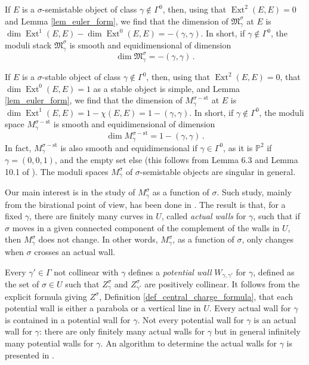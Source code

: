 \documentclass[12pt, a4paper]{amsart}
\newcommand\PP{\mathbb P}
\newcommand\fM{\mathfrak M}
\newcommand\Ext{\operatorname{Ext}}
\newcommand\st{\mathrm{st}}
\begin{document}
If $E$ is a $\sigma$-semistable object of class $\gamma \notin \Gamma^0$, then,
using that $\Ext^2(E,E)=0$ and Lemma \ref{lem_euler_form},
we find that the dimension of 
$\fM_\gamma^{\sigma}$ at $E$ is
$\dim \Ext^1(E,E)-\dim \Ext^0(E,E)
=-(\gamma,\gamma)$. In short, if
$\gamma \notin \Gamma^0$, the moduli stack
$\fM_\gamma^{\sigma}$ is smooth and equidimensional of dimension
\[ \dim \fM_\gamma^\sigma=-(\gamma,\gamma)\,.\]

If $E$ is a $\sigma$-stable object of class $\gamma \notin \Gamma^0$, then,
using that $\Ext^2(E,E)=0$, that $\dim \Ext^0(E,E)=1$
as a stable object is simple, and Lemma \ref{lem_euler_form},
we find that the dimension of $M_\gamma^{\sigma-\st}$ at $E$ is $\dim \Ext^1(E,E)=1-\chi(E,E)=1-(\gamma,\gamma)$.
In short, if $\gamma \notin \Gamma^0$, the moduli space $M_\gamma^{\sigma-\st}$ is smooth and equidimensional of dimension
\[ \dim M_\gamma^{\sigma-\st}
=1-(\gamma,\gamma) \,.\]
In fact, $M_\gamma^{\sigma-\st}$ is also smooth and equidimensional if $\gamma \in \Gamma^0$, as it is 
$\PP^2$ if $\gamma=(0,0,1)$, and the empty set else (this follows from Lemma 6.3 and Lemma 10.1 of \cite{MR2376815}).
The moduli spaces
$M_\gamma^\sigma$ of $\sigma$-semistable objects are singular in general.

Our main interest is in the study of $M_\gamma^\sigma$ as a function of 
$\sigma$.
Such study, mainly from the birational point of view, has been done in 
\cite{MR3010070, MR3275289, MR3455422, MR3271294, MR3381441, MR3635357, MR3419956, MR3800356, MR3921322, MR3615584, MR2681544, woolf2013nef}.
The result is that, for a fixed $\gamma$, there are finitely many 
curves in $U$, called \emph{actual walls} for $\gamma$, such that if $\sigma$
moves in a given connected component of the complement of the walls in $U$,
then $M_\gamma^{\sigma}$ does not change. In other words, 
$M_\gamma^\sigma$, as a function of $\sigma$, only changes when 
$\sigma$ crosses an actual wall. 

Every $\gamma' \in \Gamma$ not collinear with $\gamma$ defines a \emph{potential wall} $W_{\gamma,\gamma'}$ for $\gamma$, defined
as the set of $\sigma \in U$ such that $Z_{\gamma}^{\sigma}$ and $Z_{\gamma'}^{\sigma}$
are positively collinear. It follows from the explicit formula giving 
$Z^\sigma$, Definition \ref{def_central_charge_formula}, that each potential wall is either a parabola or a vertical 
line in $U$. Every actual wall for $\gamma$ is contained in a potential wall for $\gamma$.
Not every potential wall for $\gamma$ is an actual wall for $\gamma$: there are only 
finitely many actual  walls for $\gamma$ but in general infinitely many potential walls for $\gamma$.
An algorithm to determine the actual walls for $\gamma$ is presented in \cite{MR3921322}.
\end{document}
